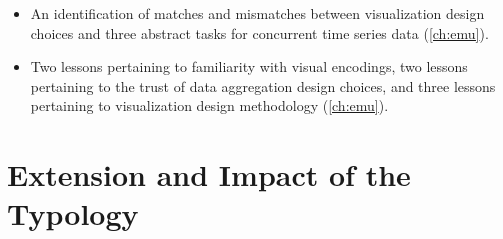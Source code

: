 \begin{itemize}
    \item An identification of matches and mismatches between visualization design choices and three abstract tasks for concurrent time series data (\autoref{ch:emu}).
    \item Two lessons pertaining to familiarity with visual encodings, two lessons pertaining to the trust of data aggregation design choices, and three lessons pertaining to visualization design methodology (\autoref{ch:emu}).
\end{itemize}


\section{Extension and Impact of the Typology}
\label{intro:adoption}



